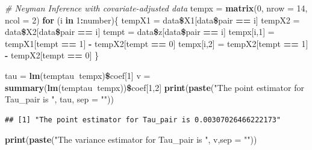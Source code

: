 \documentclass[]{article}
\newenvironment{Shaded}{\begin{snugshade}}{\end{snugshade}}
\newcommand{\KeywordTok}[1]{\textcolor[rgb]{0.13,0.29,0.53}{\textbf{#1}}}
\newcommand{\DataTypeTok}[1]{\textcolor[rgb]{0.13,0.29,0.53}{#1}}
\newcommand{\DecValTok}[1]{\textcolor[rgb]{0.00,0.00,0.81}{#1}}
\newcommand{\StringTok}[1]{\textcolor[rgb]{0.31,0.60,0.02}{#1}}
\newcommand{\CommentTok}[1]{\textcolor[rgb]{0.56,0.35,0.01}{\textit{#1}}}
\newcommand{\ControlFlowTok}[1]{\textcolor[rgb]{0.13,0.29,0.53}{\textbf{#1}}}
\newcommand{\OperatorTok}[1]{\textcolor[rgb]{0.81,0.36,0.00}{\textbf{#1}}}
\newcommand{\NormalTok}[1]{#1}
\begin{document}
\begin{Shaded}
\begin{Highlighting}[]
\CommentTok{# Neyman Inference with covariate-adjusted data}
\NormalTok{tempx =}\StringTok{ }\KeywordTok{matrix}\NormalTok{(}\DecValTok{0}\NormalTok{, }\DataTypeTok{nrow =} \DecValTok{14}\NormalTok{, }\DataTypeTok{ncol =} \DecValTok{2}\NormalTok{)}
\ControlFlowTok{for}\NormalTok{ (i }\ControlFlowTok{in} \DecValTok{1}\OperatorTok{:}\NormalTok{number)\{}
\NormalTok{  tempX1 =}\StringTok{ }\NormalTok{data}\OperatorTok{\$}\NormalTok{X1[data}\OperatorTok{\$}\NormalTok{pair }\OperatorTok{==}\StringTok{ }\NormalTok{i]}
\NormalTok{  tempX2 =}\StringTok{ }\NormalTok{data}\OperatorTok{\$}\NormalTok{X2[data}\OperatorTok{\$}\NormalTok{pair }\OperatorTok{==}\StringTok{ }\NormalTok{i]}
\NormalTok{  tempt =}\StringTok{ }\NormalTok{data}\OperatorTok{\$}\NormalTok{z[data}\OperatorTok{\$}\NormalTok{pair }\OperatorTok{==}\StringTok{ }\NormalTok{i]}
\NormalTok{  tempx[i,}\DecValTok{1}\NormalTok{] =}\StringTok{ }\NormalTok{tempX1[tempt }\OperatorTok{==}\StringTok{ }\DecValTok{1}\NormalTok{] }\OperatorTok{-}\StringTok{ }\NormalTok{tempX2[tempt }\OperatorTok{==}\StringTok{ }\DecValTok{0}\NormalTok{]}
\NormalTok{  tempx[i,}\DecValTok{2}\NormalTok{] =}\StringTok{ }\NormalTok{tempX2[tempt }\OperatorTok{==}\StringTok{ }\DecValTok{1}\NormalTok{] }\OperatorTok{-}\StringTok{ }\NormalTok{tempX2[tempt }\OperatorTok{==}\StringTok{ }\DecValTok{0}\NormalTok{]}
\NormalTok{\}}

\NormalTok{tau =}\StringTok{ }\KeywordTok{lm}\NormalTok{(temptau}\OperatorTok{~}\NormalTok{tempx)}\OperatorTok{\$}\NormalTok{coef[}\DecValTok{1}\NormalTok{]}
\NormalTok{v =}\StringTok{ }\KeywordTok{summary}\NormalTok{(}\KeywordTok{lm}\NormalTok{(temptau}\OperatorTok{~}\NormalTok{tempx))}\OperatorTok{\$}\NormalTok{coef[}\DecValTok{1}\NormalTok{,}\DecValTok{2}\NormalTok{]}
\KeywordTok{print}\NormalTok{(}\KeywordTok{paste}\NormalTok{(}\StringTok{"The point estimator for Tau_pair is "}\NormalTok{, tau, }\DataTypeTok{sep =} \StringTok{""}\NormalTok{))}
\end{Highlighting}
\end{Shaded}

\begin{verbatim}
## [1] "The point estimator for Tau_pair is 0.00307026466222173"
\end{verbatim}

\begin{Shaded}
\begin{Highlighting}[]
\KeywordTok{print}\NormalTok{(}\KeywordTok{paste}\NormalTok{(}\StringTok{"The variance estimator for Tau_pair is "}\NormalTok{, v,}\DataTypeTok{sep =} \StringTok{""}\NormalTok{))}
\end{Highlighting}
\end{Shaded}
\end{document}
